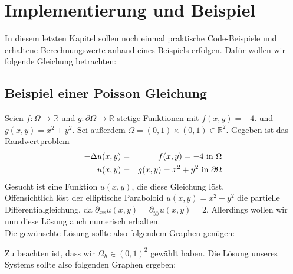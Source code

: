 \chapter{Implementierung und Beispiel}\label{c.Vergleich}

In diesem letzten Kapitel sollen noch einmal praktische Code-Beispiele und erhaltene Berechnungswerte anhand eines Beispiels erfolgen. Dafür wollen wir folgende Gleichung betrachten:

\section{Beispiel einer Poisson Gleichung}\label{s.Beispiel einer Poisson Gleichung}

Seien $f: \Omega \rightarrow \mathbb{R}$ und $g: \partial\Omega \rightarrow \mathbb{R}$ stetige Funktionen mit $f(x,y) = -4.$ und $g(x,y) = x^{2} + y^{2}$. Sei außerdem $\Omega = (0,1)\times(0,1) \in \mathbb{R}^{2}$. Gegeben ist das Randwertproblem
\begin{eqnarray}
        -\Delta u(x,y) &=& f(x,y) = -4 \textnormal{ in } \Omega \\
    u(x,y) &=& g(x,y) = x^{2} + y^{2} \textnormal{ in } \partial \Omega
\end{eqnarray}
Gesucht ist eine Funktion $u(x,y)$, die diese Gleichung löst. \\
Offensichtlich löst der elliptische Paraboloid $u(x,y) = x^{2} + y^{2}$ die partielle Differentialgleichung, da $\partial_{xx}u(x,y) = \partial_{yy}u(x,y) = 2$. Allerdings wollen wir nun diese Lösung auch numerisch erhalten.\\
Die gewünschte Lösung sollte also folgendem Graphen genügen:


Zu beachten ist, dass wir $\Omega_{h} \in (0,1)^{2}$ gewählt haben. Die Lösung unseres Systems sollte also folgenden Graphen ergeben:


